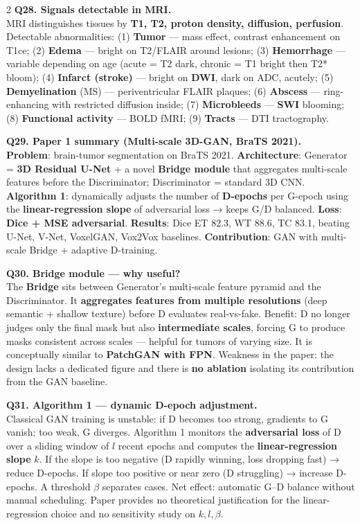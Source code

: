 \begin{paracol}{2}
\textbf{Q28. Signals detectable in MRI.}\\
MRI distinguishes tissues by \textbf{T1, T2, proton density, diffusion, perfusion}. Detectable abnormalities: (1) \textbf{Tumor} — mass effect, contrast enhancement on T1ce; (2) \textbf{Edema} — bright on T2/FLAIR around lesions; (3) \textbf{Hemorrhage} — variable depending on age (acute = T2 dark, chronic = T1 bright then T2* bloom); (4) \textbf{Infarct (stroke)} — bright on \textbf{DWI}, dark on ADC, acutely; (5) \textbf{Demyelination} (MS) — periventricular FLAIR plaques; (6) \textbf{Abscess} — ring-enhancing with restricted diffusion inside; (7) \textbf{Microbleeds} — \textbf{SWI} blooming; (8) \textbf{Functional activity} — BOLD fMRI; (9) \textbf{Tracts} — DTI tractography.

\textbf{Q29. Paper 1 summary (Multi-scale 3D-GAN, BraTS 2021).}\\
\textbf{Problem}: brain-tumor segmentation on BraTS 2021. \textbf{Architecture}: Generator = \textbf{3D Residual U-Net} + a novel \textbf{Bridge module} that aggregates multi-scale features before the Discriminator; Discriminator = standard 3D CNN. \textbf{Algorithm 1}: dynamically adjusts the number of \textbf{D-epochs} per G-epoch using the \textbf{linear-regression slope} of adversarial loss → keeps G/D balanced. \textbf{Loss}: \textbf{Dice + MSE adversarial}. \textbf{Results}: Dice ET 82.3, WT 88.6, TC 83.1, beating U-Net, V-Net, VoxelGAN, Vox2Vox baselines. \textbf{Contribution}: GAN with multi-scale Bridge + adaptive D-training.

\textbf{Q30. Bridge module — why useful?}\\
The \textbf{Bridge} sits between Generator's multi-scale feature pyramid and the Discriminator. It \textbf{aggregates features from multiple resolutions} (deep semantic + shallow texture) before D evaluates real-vs-fake. Benefit: D no longer judges only the final mask but also \textbf{intermediate scales}, forcing G to produce masks consistent across scales — helpful for tumors of varying size. It is conceptually similar to \textbf{PatchGAN with FPN}. Weakness in the paper: the design lacks a dedicated figure and there is \textbf{no ablation} isolating its contribution from the GAN baseline.

\textbf{Q31. Algorithm 1 — dynamic D-epoch adjustment.}\\
Classical GAN training is unstable: if D becomes too strong, gradients to G vanish; too weak, G diverges. Algorithm 1 monitors the \textbf{adversarial loss} of D over a sliding window of $l$ recent epochs and computes the \textbf{linear-regression slope} $k$. If the slope is too negative (D rapidly winning, loss dropping fast) → reduce D-epochs. If slope too positive or near zero (D struggling) → increase D-epochs. A threshold $\beta$ separates cases. Net effect: automatic G--D balance without manual scheduling. Paper provides no theoretical justification for the linear-regression choice and no sensitivity study on $k,l,\beta$.


\end{paracol}
